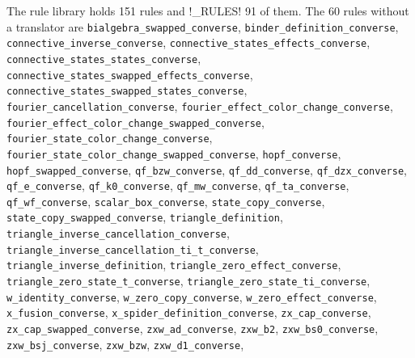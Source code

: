 {The rule library holds 151 rules and \py!_RULES! 91 of them. The 60 rules without a translator are \texttt{bialgebra\_\allowbreak{}swapped\_\allowbreak{}converse}, \texttt{binder\_\allowbreak{}definition\_\allowbreak{}converse}, \texttt{connective\_\allowbreak{}inverse\_\allowbreak{}converse}, \texttt{connective\_\allowbreak{}states\_\allowbreak{}effects\_\allowbreak{}converse}, \texttt{connective\_\allowbreak{}states\_\allowbreak{}states\_\allowbreak{}converse}, \texttt{connective\_\allowbreak{}states\_\allowbreak{}swapped\_\allowbreak{}effects\_\allowbreak{}converse}, \texttt{connective\_\allowbreak{}states\_\allowbreak{}swapped\_\allowbreak{}states\_\allowbreak{}converse}, \texttt{fourier\_\allowbreak{}cancellation\_\allowbreak{}converse}, \texttt{fourier\_\allowbreak{}effect\_\allowbreak{}color\_\allowbreak{}change\_\allowbreak{}converse}, \texttt{fourier\_\allowbreak{}effect\_\allowbreak{}color\_\allowbreak{}change\_\allowbreak{}swapped\_\allowbreak{}converse}, \texttt{fourier\_\allowbreak{}state\_\allowbreak{}color\_\allowbreak{}change\_\allowbreak{}converse}, \texttt{fourier\_\allowbreak{}state\_\allowbreak{}color\_\allowbreak{}change\_\allowbreak{}swapped\_\allowbreak{}converse}, \texttt{hopf\_\allowbreak{}converse}, \texttt{hopf\_\allowbreak{}swapped\_\allowbreak{}converse}, \texttt{qf\_\allowbreak{}bzw\_\allowbreak{}converse}, \texttt{qf\_\allowbreak{}dd\_\allowbreak{}converse}, \texttt{qf\_\allowbreak{}dzx\_\allowbreak{}converse}, \texttt{qf\_\allowbreak{}e\_\allowbreak{}converse}, \texttt{qf\_\allowbreak{}k0\_\allowbreak{}converse}, \texttt{qf\_\allowbreak{}mw\_\allowbreak{}converse}, \texttt{qf\_\allowbreak{}ta\_\allowbreak{}converse}, \texttt{qf\_\allowbreak{}wf\_\allowbreak{}converse}, \texttt{scalar\_\allowbreak{}box\_\allowbreak{}converse}, \texttt{state\_\allowbreak{}copy\_\allowbreak{}converse}, \texttt{state\_\allowbreak{}copy\_\allowbreak{}swapped\_\allowbreak{}converse}, \texttt{triangle\_\allowbreak{}definition}, \texttt{triangle\_\allowbreak{}inverse\_\allowbreak{}cancellation\_\allowbreak{}converse}, \texttt{triangle\_\allowbreak{}inverse\_\allowbreak{}cancellation\_\allowbreak{}ti\_\allowbreak{}t\_\allowbreak{}converse}, \texttt{triangle\_\allowbreak{}inverse\_\allowbreak{}definition}, \texttt{triangle\_\allowbreak{}zero\_\allowbreak{}effect\_\allowbreak{}converse}, \texttt{triangle\_\allowbreak{}zero\_\allowbreak{}state\_\allowbreak{}t\_\allowbreak{}converse}, \texttt{triangle\_\allowbreak{}zero\_\allowbreak{}state\_\allowbreak{}ti\_\allowbreak{}converse}, \texttt{w\_\allowbreak{}identity\_\allowbreak{}converse}, \texttt{w\_\allowbreak{}zero\_\allowbreak{}copy\_\allowbreak{}converse}, \texttt{w\_\allowbreak{}zero\_\allowbreak{}effect\_\allowbreak{}converse}, \texttt{x\_\allowbreak{}fusion\_\allowbreak{}converse}, \texttt{x\_\allowbreak{}spider\_\allowbreak{}definition\_\allowbreak{}converse}, \texttt{zx\_\allowbreak{}cap\_\allowbreak{}converse}, \texttt{zx\_\allowbreak{}cap\_\allowbreak{}swapped\_\allowbreak{}converse}, \texttt{zxw\_\allowbreak{}ad\_\allowbreak{}converse}, \texttt{zxw\_\allowbreak{}b2}, \texttt{zxw\_\allowbreak{}bs0\_\allowbreak{}converse}, \texttt{zxw\_\allowbreak{}bsj\_\allowbreak{}converse}, \texttt{zxw\_\allowbreak{}bzw}, \texttt{zxw\_\allowbreak{}d1\_\allowbreak{}converse}, }
